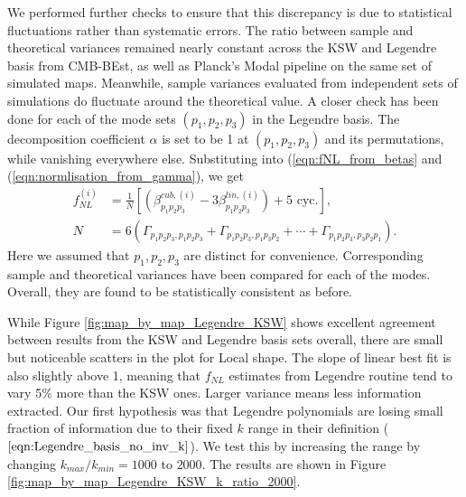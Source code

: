 We performed further checks to ensure that this discrepancy is due to statistical fluctuations rather than systematic errors. The ratio between sample and theoretical variances remained nearly constant across the KSW and Legendre basis from CMB-BEst, as well as Planck's Modal pipeline on the same set of simulated maps. Meanwhile, sample variances evaluated from independent sets of simulations do fluctuate around the theoretical value. A closer check has been done for each of the mode sets $(p_1,p_2,p_3)$ in the Legendre basis. The decomposition coefficient $\alpha$ is set to be 1 at $(p_1,p_2,p_3)$ and its permutations, while vanishing everywhere else. Substituting into (\ref{eqn:fNL_from_betas} and (\ref{eqn:normlisation_from_gamma}), we get
\begin{align}
	f_{NL}^{(i)} &= \frac{1}{N} \left[ \left( \beta^{cub,(i)}_{p_1 p_2 p_3} - 3 \beta^{lin,(i)}_{p_1 p_2 p_3} \right) + \text{5 cyc.} \right], \\
	N &= 6\left( \Gamma_{p_1 p_2 p_3, p_1 p_2 p_3} + \Gamma_{p_1 p_2 p_3, p_1 p_3 p_2} + \cdots + \Gamma_{p_1 p_2 p_3, p_3 p_2 p_1} \right).
\end{align}
Here we assumed that $p_1,p_2,p_3$ are distinct for convenience. Corresponding sample and theoretical variances have been compared for each of the modes. Overall, they are found to be statistically consistent as before.


While Figure \ref{fig:map_by_map_Legendre_KSW} shows excellent agreement between results from the KSW and Legendre basis sets overall, there are small but noticeable scatters in the plot for Local shape. The slope of linear best fit is also slightly above 1, meaning that $f_{NL}$ estimates from Legendre routine tend to vary 5\% more than the KSW ones. Larger variance means less information extracted. Our first hypothesis was that Legendre polynomials are losing small fraction of information due to their fixed $k$ range in their definition ($\ref{eqn:Legendre_basis_no_inv_k}$). We test this by increasing the range by changing $k_{max}/k_{min} = 1000$ to $2000$. The results are shown in Figure \ref{fig:map_by_map_Legendre_KSW_k_ratio_2000}.

